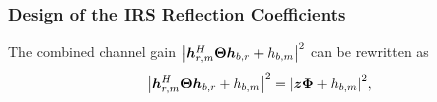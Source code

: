 \documentclass[journal]{IEEEtran}
\begin{document}


\subsubsection{Design of the IRS Reflection Coefficients}
The combined channel gain $ {\left| {\bm{h}_{r,m}^H{\bf{\Theta }}{\bm{h}_{b,r}} + {h_{b,m}}} \right|^2} $ can be rewritten as
\begin{equation}
{\left| {\bm{h}_{r,m}^H{\bf{\Theta }}{\bm{h}_{b,r}} + {h_{b,m}}} \right|^2} = {\left| {\bm{z}{\bf{\Phi }} + {h_{b,m}}} \right|^2},
\end{equation}
\end{document}
